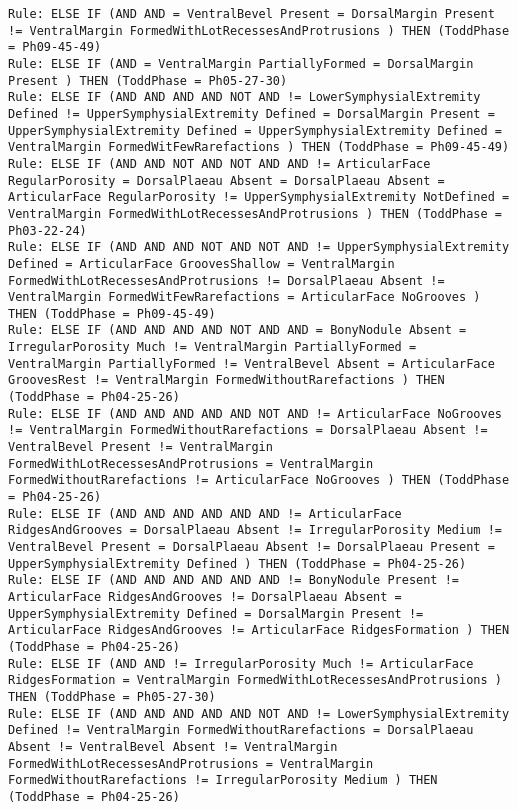 \begin{lstlisting}
Rule: ELSE IF (AND AND = VentralBevel Present = DorsalMargin Present != VentralMargin FormedWithLotRecessesAndProtrusions ) THEN (ToddPhase = Ph09-45-49)
Rule: ELSE IF (AND = VentralMargin PartiallyFormed = DorsalMargin Present ) THEN (ToddPhase = Ph05-27-30)
Rule: ELSE IF (AND AND AND AND NOT AND != LowerSymphysialExtremity Defined != UpperSymphysialExtremity Defined = DorsalMargin Present = UpperSymphysialExtremity Defined = UpperSymphysialExtremity Defined = VentralMargin FormedWitFewRarefactions ) THEN (ToddPhase = Ph09-45-49)
Rule: ELSE IF (AND AND NOT AND NOT AND AND != ArticularFace RegularPorosity = DorsalPlaeau Absent = DorsalPlaeau Absent = ArticularFace RegularPorosity != UpperSymphysialExtremity NotDefined = VentralMargin FormedWithLotRecessesAndProtrusions ) THEN (ToddPhase = Ph03-22-24)
Rule: ELSE IF (AND AND AND NOT AND NOT AND != UpperSymphysialExtremity Defined = ArticularFace GroovesShallow = VentralMargin FormedWithLotRecessesAndProtrusions != DorsalPlaeau Absent != VentralMargin FormedWitFewRarefactions = ArticularFace NoGrooves ) THEN (ToddPhase = Ph09-45-49)
Rule: ELSE IF (AND AND AND AND NOT AND AND = BonyNodule Absent = IrregularPorosity Much != VentralMargin PartiallyFormed = VentralMargin PartiallyFormed != VentralBevel Absent = ArticularFace GroovesRest != VentralMargin FormedWithoutRarefactions ) THEN (ToddPhase = Ph04-25-26)
Rule: ELSE IF (AND AND AND AND AND NOT AND != ArticularFace NoGrooves != VentralMargin FormedWithoutRarefactions = DorsalPlaeau Absent != VentralBevel Present != VentralMargin FormedWithLotRecessesAndProtrusions = VentralMargin FormedWithoutRarefactions != ArticularFace NoGrooves ) THEN (ToddPhase = Ph04-25-26)
Rule: ELSE IF (AND AND AND AND AND AND != ArticularFace RidgesAndGrooves = DorsalPlaeau Absent != IrregularPorosity Medium != VentralBevel Present = DorsalPlaeau Absent != DorsalPlaeau Present = UpperSymphysialExtremity Defined ) THEN (ToddPhase = Ph04-25-26)
Rule: ELSE IF (AND AND AND AND AND AND != BonyNodule Present != ArticularFace RidgesAndGrooves != DorsalPlaeau Absent = UpperSymphysialExtremity Defined = DorsalMargin Present != ArticularFace RidgesAndGrooves != ArticularFace RidgesFormation ) THEN (ToddPhase = Ph04-25-26)
Rule: ELSE IF (AND AND != IrregularPorosity Much != ArticularFace RidgesFormation = VentralMargin FormedWithLotRecessesAndProtrusions ) THEN (ToddPhase = Ph05-27-30)
Rule: ELSE IF (AND AND AND AND AND NOT AND != LowerSymphysialExtremity Defined != VentralMargin FormedWithoutRarefactions = DorsalPlaeau Absent != VentralBevel Absent != VentralMargin FormedWithLotRecessesAndProtrusions = VentralMargin FormedWithoutRarefactions != IrregularPorosity Medium ) THEN (ToddPhase = Ph04-25-26)

\end{lstlisting}
